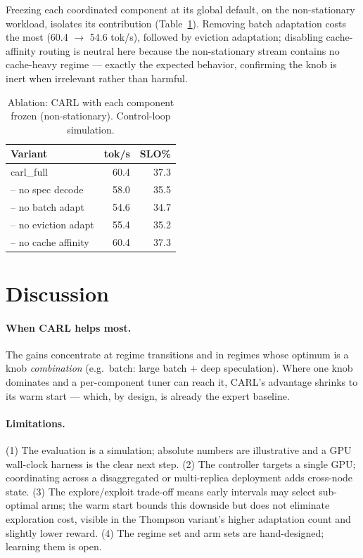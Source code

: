 \documentclass[10pt,twocolumn]{article}
\begin{document}
Freezing each coordinated component at its global default, on the non-stationary
workload, isolates its contribution (Table~\ref{tab:ablation}). Removing batch
adaptation costs the most (60.4 $\rightarrow$ 54.6 tok/s), followed by eviction
adaptation; disabling cache-affinity routing is neutral here because the
non-stationary stream contains no cache-heavy regime --- exactly the expected
behavior, confirming the knob is inert when irrelevant rather than harmful.

\begin{table}[t]
\centering
\small
\caption{Ablation: CARL with each component frozen (non-stationary). Control-loop simulation.}
\label{tab:ablation}
\begin{tabular}{lrr}
\toprule
Variant & tok/s & SLO\% \\
\midrule
carl\_full              & 60.4 & 37.3 \\
\;\;-- no spec decode   & 58.0 & 35.5 \\
\;\;-- no batch adapt   & 54.6 & 34.7 \\
\;\;-- no eviction adapt& 55.4 & 35.2 \\
\;\;-- no cache affinity& 60.4 & 37.3 \\
\bottomrule
\end{tabular}
\end{table}

\section{Discussion}
\label{sec:discussion}

\paragraph{When CARL helps most.} The gains concentrate at regime transitions and
in regimes whose optimum is a knob \emph{combination} (e.g.\ batch: large batch
$+$ deep speculation). Where one knob dominates and a per-component tuner can
reach it, CARL's advantage shrinks to its warm start --- which, by design, is
already the expert baseline.

\paragraph{Limitations.} (1) The evaluation is a simulation; absolute numbers are
illustrative and a GPU wall-clock harness is the clear next step. (2) The
controller targets a single GPU; coordinating across a disaggregated or
multi-replica deployment adds cross-node state. (3) The explore/exploit trade-off
means early intervals may select sub-optimal arms; the warm start bounds this
downside but does not eliminate exploration cost, visible in the Thompson
variant's higher adaptation count and slightly lower reward. (4) The regime set
and arm sets are hand-designed; learning them is open.
\end{document}

